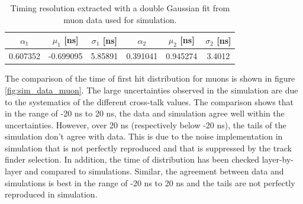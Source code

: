 \begin{table}[htb!]
	\centering
	\caption{Timing resolution extracted with a double Gaussian fit from muon data used for simulation.}
	\label{table:time_res_sim}
	\begin{tabular}{@{} cccccc @{}}
		\toprule
		$\alpha_{1}$ & $\mu_{1}$ [ns] & $\sigma_{1}$ [ns] & $\alpha_{2}$ & $\mu_{2}$ [ns] & $\sigma_{2}$ [ns] \\
		\midrule
		0.607352 & -0.699095 & 5.85891 & 0.391041 & 0.945274 & 3.4012 \\
		\bottomrule
	\end{tabular}
\end{table}

The comparison of the time of first hit distribution for muons is shown in figure \ref{fig:sim_data_muon}. The large uncertainties observed in the simulation are due to the systematics of the different cross-talk values. The comparison shows that in the range of -20 ns to 20 ns, the data and simulation agree well within the uncertainties. However, over 20 ns (respectively below -20 ns), the tails of the simulation don't agree with data. This is due to the noise implementation in simulation that is not perfectly reproduced and that is suppressed by the track finder selection. In addition, the time of distribution has been checked layer-by-layer and compared to simulations. Similar, the agreement between data and simulations is best in the range of -20 ns to 20 ns and the tails are not perfectly reproduced in simulation.

